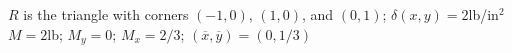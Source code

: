 {$R$ is the triangle with corners $(-1,0)$, $(1,0)$, and $(0,1)$; $\delta(x,y) = 2$lb/in$^2$
}
{$M = 2$lb; $M_y= 0$; $M_x = 2/3$; $(\overline{x},\overline{y}) = (0,1/3)$
}